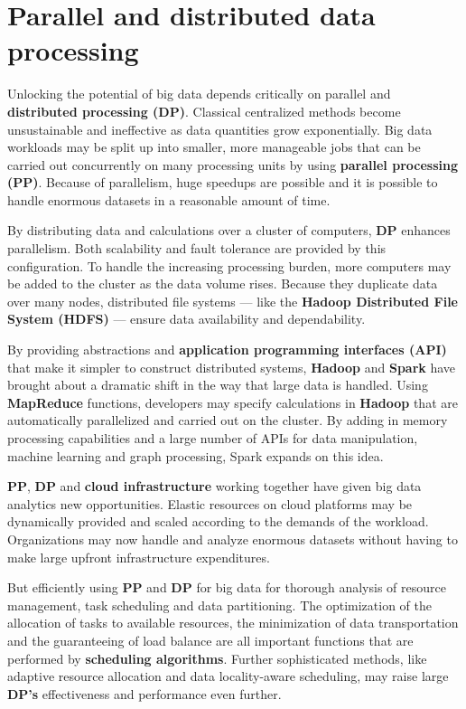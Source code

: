 \chapter{Parallel and distributed data processing}

Unlocking the potential of big data depends critically on parallel and \textbf{distributed processing (DP)}. Classical centralized methods become unsustainable and ineffective as data quantities grow exponentially. Big data workloads may be split up into smaller, more manageable jobs that can be carried out concurrently on many processing units by using \textbf{parallel processing (PP)}. Because of parallelism, huge speedups are possible and it is possible to handle enormous datasets in a reasonable amount of time. 

By distributing data and calculations over a cluster of computers, \textbf{DP} enhances parallelism. Both scalability and fault tolerance are provided by this configuration. To handle the increasing processing burden, more computers may be added to the cluster as the data volume rises. Because they duplicate data over many nodes, distributed file systems — like the \textbf{Hadoop Distributed File System (HDFS)} — ensure data availability and dependability.

By providing abstractions and \textbf{application programming interfaces (API)} that make it simpler to construct distributed systems, \textbf{Hadoop} and \textbf{Spark} have brought about a dramatic shift in the way that large data is handled. Using \textbf{MapReduce} functions, developers may specify calculations in \textbf{Hadoop} that are automatically parallelized and carried out on the cluster. By adding in memory processing capabilities and a large number of APIs for data manipulation, machine learning and graph processing, Spark expands on this idea.

\textbf{PP}, \textbf{DP} and \textbf{cloud infrastructure} working together have given big data analytics new opportunities. Elastic resources on cloud platforms may be dynamically provided and scaled according to the demands of the workload. Organizations may now handle and analyze enormous datasets without having to make large upfront infrastructure expenditures.

But efficiently using \textbf{PP} and \textbf{DP} for big data for thorough analysis of resource management, task scheduling and data partitioning. The optimization of the allocation of tasks to available resources, the minimization of data transportation and the guaranteeing of load balance are all important functions that are performed by \textbf{scheduling algorithms}. Further sophisticated methods, like adaptive resource allocation and data locality-aware scheduling, may raise large \textbf{DP's} effectiveness and performance even further.

